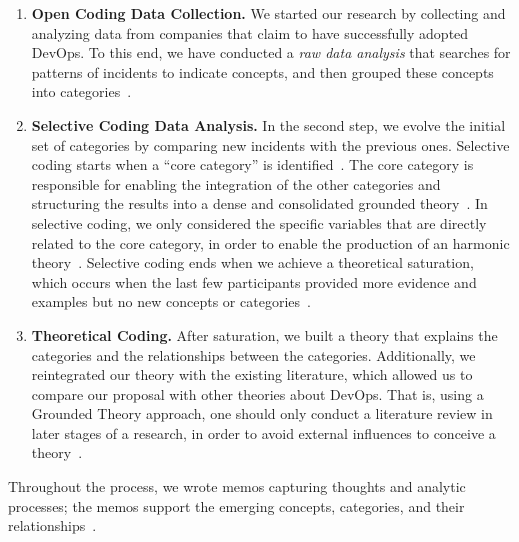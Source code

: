\begin{enumerate}[label=(\Alph*)]
\item {\bf Open Coding Data Collection.} We started our research
  by collecting and analyzing data from companies that claim to have
  successfully adopted DevOps.
  To this end, we have conducted a \emph{raw data analysis} that searches for patterns of
  incidents to indicate concepts,  and then grouped these concepts into
  categories~\cite{stol2016grounded}.

\item {\bf Selective Coding Data Analysis.} In the second step, we evolve
  the initial set of
  categories by comparing new incidents with the previous ones. Selective coding
  starts when a ``core category'' is identified~\cite{stol2016grounded}.
  The core category is responsible for enabling the integration of the other
  categories and structuring the results into a dense and consolidated grounded
  theory~\cite{jantunen2014using}. In selective coding, we only considered the
  specific variables that are directly related to the core category, in order to
  enable the production of an harmonic theory~\cite{coleman2007using,hoda2011impact}.
  Selective coding ends when we achieve a theoretical saturation, which occurs
  when the last few participants provided more evidence and examples but no new
  concepts or categories~\cite{glase1967discovery}.

\item {\bf Theoretical Coding.} After saturation, we built a theory that
explains the categories and the relationships between the categories.
Additionally, we reintegrated our theory with the existing literature, which allowed us to compare our proposal
 with other theories about DevOps. That is, using a Grounded Theory approach,
 one should only conduct a literature review in later stages of a research,
in order to avoid external influences to conceive a theory~\cite{adolph2012reconciling}.

\end{enumerate}

Throughout the process, we wrote memos capturing thoughts and analytic
processes; the memos support the emerging concepts, categories, and their
relationships~\cite{adolph2012reconciling}.

